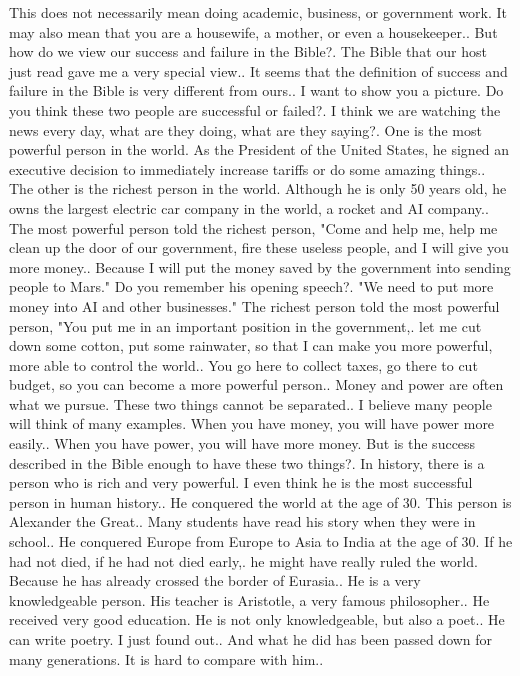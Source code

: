 \documentclass{book}
\begin{document}
This does not necessarily mean doing academic, business, or government work. It may also mean that you are a housewife, a mother, or even a housekeeper..
But how do we view our success and failure in the Bible?.
The Bible that our host just read gave me a very special view..
It seems that the definition of success and failure in the Bible is very different from ours..
I want to show you a picture. Do you think these two people are successful or failed?.
I think we are watching the news every day, what are they doing, what are they saying?.
One is the most powerful person in the world. As the President of the United States, he signed an executive decision to immediately increase tariffs or do some amazing things..
The other is the richest person in the world. Although he is only 50 years old, he owns the largest electric car company in the world, a rocket and AI company..
The most powerful person told the richest person, "Come and help me, help me clean up the door of our government, fire these useless people, and I will give you more money..
Because I will put the money saved by the government into sending people to Mars." Do you remember his opening speech?.
"We need to put more money into AI and other businesses." The richest person told the most powerful person, "You put me in an important position in the government,.
let me cut down some cotton, put some rainwater, so that I can make you more powerful, more able to control the world..
You go here to collect taxes, go there to cut budget, so you can become a more powerful person..
Money and power are often what we pursue. These two things cannot be separated..
I believe many people will think of many examples. When you have money, you will have power more easily..
When you have power, you will have more money. But is the success described in the Bible enough to have these two things?.
In history, there is a person who is rich and very powerful. I even think he is the most successful person in human history..
He conquered the world at the age of 30. This person is Alexander the Great..
Many students have read his story when they were in school..
He conquered Europe from Europe to Asia to India at the age of 30. If he had not died, if he had not died early,.
he might have really ruled the world. Because he has already crossed the border of Eurasia..
He is a very knowledgeable person. His teacher is Aristotle, a very famous philosopher..
He received very good education. He is not only knowledgeable, but also a poet..
He can write poetry. I just found out..
And what he did has been passed down for many generations. It is hard to compare with him..
\end{document}
